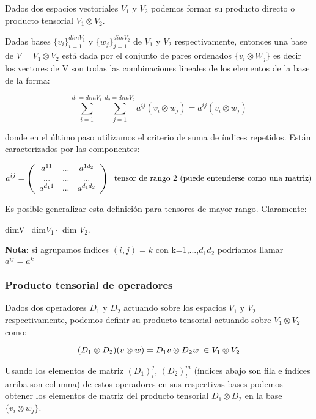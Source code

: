 \documentclass{article}
\begin{document}
Dados dos espacios vectoriales $V_1$ y $V_2$ podemos formar su producto directo o producto tensorial $V_1 \otimes V_2$.

Dadas bases $\lbrace v_i\rbrace _{i=1}^{dim V_1}$ y $\lbrace w_j\rbrace _{j=1}^{dim V_2}$ de $V_1$ y $V_2$ respectivamente, entonces una base de $V=V_1 \otimes V_2$ está dada por el conjunto de pares ordenados $\lbrace v_i \otimes W_j \rbrace$ es decir los vectores de V son todas las combinaciones lineales de los elementos de la base de la forma:

$$\sum _{i=1}^{d_1=dim V_1}\sum _{j=1}^{d_2=dimV_2} a^{ij}(v_i\otimes w_j)=a^{ij}(v_i \otimes w_j)$$

donde en el último paso utilizamos el criterio de suma de índices repetidos. Están caracterizados por las componentes:

$$a^{ij}=\left ( \begin{array}{ccc}
a^{11} & ... & a^{1d_2} \\
... & ... & ... \\
a^{d_11} & ... & a^{d_1d_2}
\end{array}\right) \hspace{0.2cm} \text{tensor de rango 2 (puede entenderse como una matriz)}$$

\smallskip

Es posible generalizar esta definición para tensores de mayor rango. Claramente:
\begin{center}
dimV=dim$V_1 \cdot $ dim $V_2$.

\end{center}

\textbf{Nota:} si agrupamos índices $(i,j)=k$ con k=1,...,$d_1d_2$ podríamos llamar $a^{ij}=a^k$

\subsubsection{Producto tensorial de operadores}

Dados dos operadores $D_1$ y $D_2$ actuando sobre los espacios $V_1$ y $V_2$ respectivamente, podemos definir su producto tensorial actuando sobre $V_1 \otimes V_2$ como:

$$(D_1\otimes D_2)(v\otimes w)=D_1v \otimes D_2w  \hspace{0.1cm} \in V_1 \otimes V_2$$

Usando los elementos de matriz $(D_1)^j_i$, $(D_2)^m_l$ (índices abajo son fila e índices arriba son columna) de estos operadores en sus respectivas bases podemos obtener los elementos de matriz del producto tensorial $D_1 \otimes D_2$ en la base $\lbrace v_i\otimes w_j \rbrace$.
\end{document}

